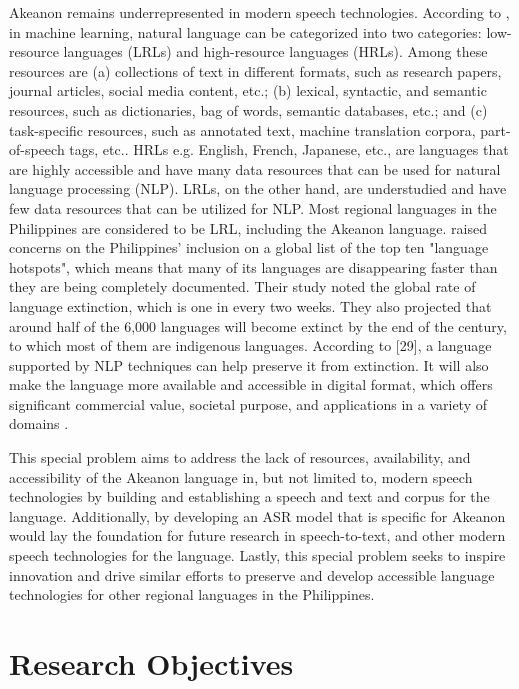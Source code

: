 Akeanon remains underrepresented in modern speech technologies. According to , in machine learning, natural language can be categorized into two categories: low-resource languages (LRLs) and high-resource languages (HRLs). Among these resources are (a) collections of text in different formats, such as research papers, journal articles, social media content, etc.; (b) lexical, syntactic, and semantic resources, such as dictionaries, bag of words, semantic databases, etc.; and (c) task-specific resources, such as annotated text, machine translation corpora, part-of-speech tags, etc.. HRLs e.g. English, French, Japanese, etc., are languages that are highly accessible and have many data resources that can be used for natural language processing (NLP). LRLs, on the other hand, are understudied and have few data resources that can be utilized for NLP.  Most regional languages in the Philippines are considered to be LRL, including the Akeanon language.  raised concerns on the Philippines' inclusion on a global list of the top ten "language hotspots", which means that many of its languages are disappearing faster than they are being completely documented. Their study noted the global rate of language extinction, which is one in every two weeks. They also projected that around half of the 6,000 languages will become extinct by the end of the century, to which most of them are indigenous languages. According to  [29], a language supported by NLP techniques can help preserve it from extinction. It will also make the language more available and accessible in digital format, which offers significant commercial value, societal purpose, and applications in a variety of domains \cite{Tsvetkov:2017}.

This special problem aims to address the lack of resources, availability, and accessibility of the Akeanon language in, but not limited to, modern speech technologies by building and establishing a speech and text and corpus for the language. Additionally, by developing an ASR model that is specific for Akeanon would lay the foundation for future research in speech-to-text, and other modern speech technologies for the language. Lastly, this special problem seeks to inspire innovation and drive similar efforts to preserve and develop accessible language technologies for other regional languages in the Philippines.

\section{Research Objectives}
\label{sec:researchobjectives}

